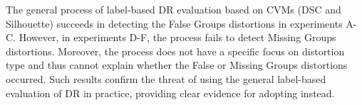 The general process of label-based DR evaluation based on CVMs (DSC and Silhouette) succeeds in detecting the False Groups distortions in experiments A-C.
However, in experiments D-F, the process fails to detect Missing Groups distortions. Moreover, the process does not have a specific focus on distortion type and thus cannot explain whether the False or Missing Groups distortions occurred.
Such results confirm the threat of using the general label-based evaluation of DR in practice, providing clear evidence for adopting \ltc instead.









